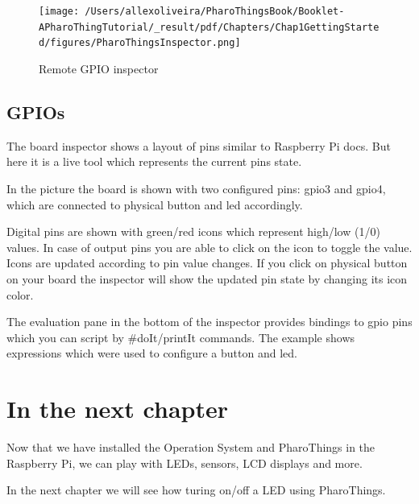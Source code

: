 \documentclass[10pt,twoside,english]{_support/latex/sbabook/sbabook}
\begin{document}
\begin{figure}

\begin{center}
\texttt{[image: /Users/allexoliveira/PharoThingsBook/Booklet-APharoThingTutorial/\_result/pdf/Chapters/Chap1GettingStarted/figures/PharoThingsInspector.png]}\caption{Remote GPIO inspector\label{PharoThingsinspector}}\end{center}
\end{figure}

\subsection{GPIOs}
The board inspector shows a layout of pins similar to Raspberry Pi docs. But here it is a live tool which represents the current pins state.

In the picture the board is shown with two configured pins: gpio3 and gpio4, which are connected to physical button and led accordingly.

Digital pins are shown with green/red icons which represent high/low (1/0) values. In case of output pins you are able to click on the icon to toggle the value. Icons are updated according to pin value changes. If you click on physical button on your board the inspector will show the updated pin state by changing its icon color.

The evaluation pane in the bottom of the inspector provides bindings to gpio pins which you can script by \#doIt/printIt commands. The example shows expressions which were used to configure a button and led.
\section{In the next chapter}
Now that we have installed the Operation System and PharoThings in the Raspberry Pi, we can play with LEDs, sensors, LCD displays and more. 

In the next chapter we will see how turing on/off a LED using PharoThings. 


\backmatter

\end{document}
